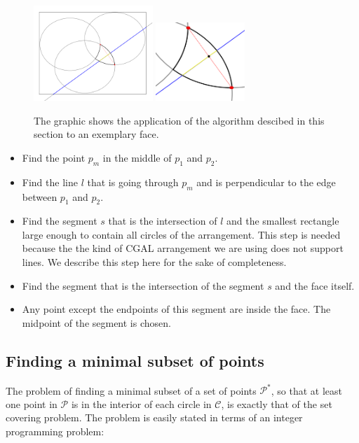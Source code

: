 \documentclass[a4paper,12pt]{article}
\begin{document}
\begin{figure}[hb]
\includegraphics[width=0.4\textwidth]{pictures/PointInFace.png}
\includegraphics[width=0.3\textwidth]{pictures/PointInFace2.png}
 \caption[Close up of \textit{Hemidactylus} sp.]
   {The graphic shows the application of the algorithm descibed in this section to an exemplary face.}
\end{figure}
\begin {itemize}
\item
Find the point $p_m$ in the middle of $p_1$ and $p_2$.
\item
Find the line $l$ that is going through $p_m$ and is perpendicular to the edge between $p_1$ and $p_2$.
\item
Find the segment $s$ that is the intersection of $l$ and the smallest rectangle large enough to contain all circles of the arrangement. This step is needed because the the kind of CGAL arrangement we are using does not support lines. We describe this step here for the sake of completeness.
\item
Find the segment that is the intersection of the segment $s$ and the face itself.
\item
Any point except the endpoints of this segment are inside the face. The midpoint of the segment is chosen.
\end{itemize}

\subsection{Finding a minimal subset of points}
\label{sec:gurobi}
The problem of finding a minimal subset of a set of points $\mathcal P^*$, so that at least one point in $\mathcal P$ is in the interior of each circle in $\mathcal C$, is exactly that of the set covering problem. The problem is easily stated in terms of an integer programming problem:
\end{document}
